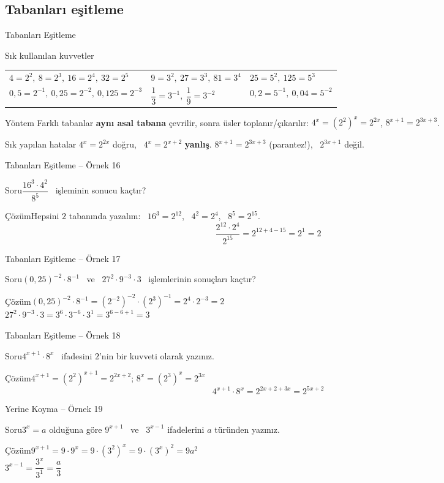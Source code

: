 \documentclass[aspectratio=169,11pt,handout]{beamer}
\newcommand{\soru}[3]{%
\begin{frame}{#1}
  \begin{block}{Soru}\large #2\end{block}
  \pause
  \begin{exampleblock}{Çözüm}\large #3\end{exampleblock}
\end{frame}}
\begin{document}
\subsection{Tabanları eşitleme}
\begin{frame}{Tabanları Eşitleme}
\begin{block}{Sık kullanılan kuvvetler}
\renewcommand{\arraystretch}{1.25}
\begin{tabular}{lll}
\(4=2^2,\ 8=2^3,\ 16=2^4,\ 32=2^5\) & \(9=3^2,\ 27=3^3,\ 81=3^4\) & \(25=5^2,\ 125=5^3\)\\
\(0{,}5=2^{-1},\ 0{,}25=2^{-2},\ 0{,}125=2^{-3}\) & \(\dfrac13=3^{-1},\ \dfrac19=3^{-2}\) & \(0{,}2=5^{-1},\ 0{,}04=5^{-2}\)
\end{tabular}
\end{block}
\begin{block}{Yöntem}
Farklı tabanlar \textbf{aynı asal tabana} çevrilir, sonra üsler toplanır/çıkarılır:\quad
\(4^x=(2^2)^x=2^{2x}\), \quad \(8^{x+1}=2^{3x+3}\).
\end{block}
\begin{alertblock}{Sık yapılan hatalar}
\(4^x=2^{2x}\) doğru, \ \(4^x=2^{x+2}\) \textbf{yanlış}. \quad \(8^{x+1}=2^{3x+3}\) (parantez!), \ \(2^{3x+1}\) değil.
\end{alertblock}
\end{frame}

\soru{Tabanları Eşitleme -- Örnek 16}
{\(\dfrac{16^3\cdot 4^2}{8^5}\) \ işleminin sonucu kaçtır?}
{Hepsini \(2\) tabanında yazalım: \ \(16^3=2^{12}\), \ \(4^2=2^4\), \ \(8^5=2^{15}\).
\[\frac{2^{12}\cdot 2^{4}}{2^{15}}=2^{12+4-15}=2^1=2\]}

\soru{Tabanları Eşitleme -- Örnek 17}
{\((0{,}25)^{-2}\cdot 8^{-1}\) \ ve \ \(27^2\cdot 9^{-3}\cdot 3\) \ işlemlerinin sonuçları kaçtır?}
{\((0{,}25)^{-2}\cdot 8^{-1}=(2^{-2})^{-2}\cdot (2^3)^{-1}=2^{4}\cdot 2^{-3}=2\)\\[4pt]
\(27^2\cdot 9^{-3}\cdot 3=3^{6}\cdot 3^{-6}\cdot 3^1=3^{6-6+1}=3\)}

\soru{Tabanları Eşitleme -- Örnek 18}
{\(4^{x+1}\cdot 8^{x}\) \ ifadesini \(2\)'nin bir kuvveti olarak yazınız.}
{\(4^{x+1}=(2^2)^{x+1}=2^{2x+2}\); \qquad \(8^{x}=(2^3)^{x}=2^{3x}\)
\[4^{x+1}\cdot 8^{x}=2^{2x+2+3x}=2^{5x+2}\]}

\soru{Yerine Koyma -- Örnek 19}
{\(3^x=a\) olduğuna göre \(9^{x+1}\) \ ve \ \(3^{x-1}\) ifadelerini \(a\) türünden yazınız.}
{\(9^{x+1}=9\cdot 9^{x}=9\cdot (3^2)^x=9\cdot (3^x)^2=9a^2\)\\[4pt]
\(3^{x-1}=\dfrac{3^x}{3^1}=\dfrac{a}{3}\)}
\end{document}
